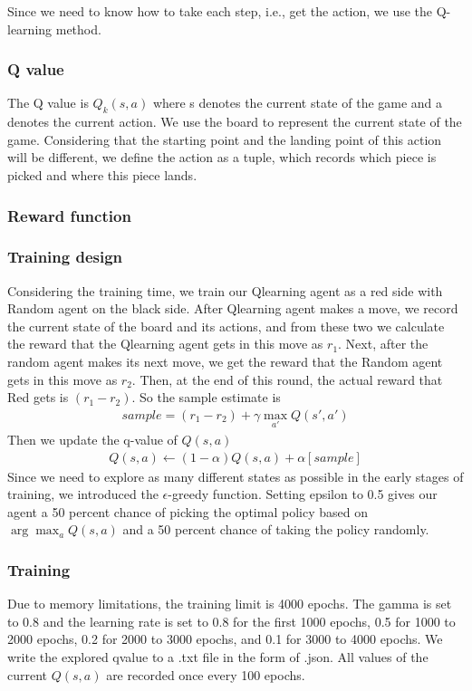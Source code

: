 Since we need to know how to take each step, i.e., get the action, we use the Q-learning method.
\subsubsection{Q value}
The Q value is $Q_{k}(s,a)$
where s denotes the current state of the game and a denotes the current action.
We use the board to represent the current state of the game. Considering that the 
starting point and the landing point of this action will be different, we define the 
action as a tuple, which records which piece is picked and where this piece lands.
\subsubsection{Reward function}

\subsubsection{Training design}
Considering the training time, we train our Qlearning agent as a red side with Random agent on the black side. 
After Qlearning agent makes a move, we record the current state of the board and its 
actions, and from these two we calculate the reward that the Qlearning agent gets in this move 
as $r_1$. Next, after the random agent makes its next move, we get the reward
that the Random agent gets in this move as $r_2$. Then, at the end of this round, the actual
reward that Red gets is $(r_1-r_2)$. So the sample estimate is
\begin{align*}
    sample=(r_1-r_2)+\gamma\max_{a'}Q(s',a')
\end{align*}
Then we update the q-value of $Q(s,a)$
\begin{align*}
    Q(s,a)\leftarrow (1-\alpha)Q(s,a)+\alpha [sample]
\end{align*}
Since we need to explore as many different states as possible in the early stages of training, 
we introduced the $\epsilon$-greedy function. Setting epsilon to 0.5 gives our agent a 50 percent chance of
picking the optimal policy based on $\arg\max_{a}Q(s,a)$ and a 50 percent chance of taking the policy randomly.

\subsubsection{Training}
Due to memory limitations, the training limit is 4000 epochs. The gamma is set to 0.8 and the 
learning rate is set to 0.8 for the first 1000 epochs, 0.5 for 1000 to 2000 epochs, 0.2 for 2000 
to 3000 epochs, and 0.1 for 3000 to 4000 epochs.
We write the explored qvalue to a .txt file in the form of .json. All values of the current $Q(s,a)$ are
recorded once every 100 epochs.